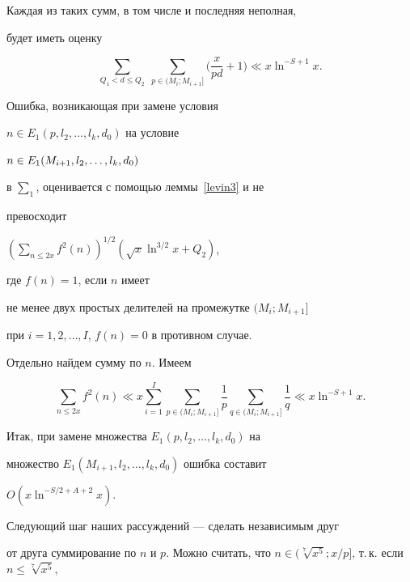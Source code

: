 Каждая из таких сумм, в том числе и последняя неполная,


будет иметь оценку


$$


\sum_{Q_1 < d \le Q_2}\; \sum_{p\in (M_{i};M_{i+1}]}


\bigg( \frac{x}{p d} + 1 \bigg)


\ll x \ln^{-S +1} x.


$$





Ошибка, возникающая при замене условия


$n\in E_1(p,l_2,\dotsc,l_k,d_0)$ на условие


$n\in E_1(M_{i+1},\linebreak l_2,\dotsc,l_k,d_0)$


в $\sum_1$, оценивается с помощью леммы~\ref{levin3} и не


превосходит


$(\sum_{n \le 2x} f^2(n) )^{1/2} (\sqrt x \ln^{3/2} x + Q_2 )$,


где $f(n)=1$, если $n$ имеет


не менее двух простых делителей на промежутке $(M_i; M_{i+1}]$


при $i=1,2, \dotsc, I$, $f(n)=0$ в противном случае.





Отдельно найдем сумму по $n$. Имеем


$$


\sum_{n \le 2x} f^2(n)


\ll x \sum_{i=1}^I \sum_{p\in (M_{i};M_{i+1}]} \frac1{p}


\sum_{q \in (M_i; M_{i+1}]} \frac1{q}


\ll x \ln^{-S+1} x.


$$


Итак, при замене множества $E_1(p, l_2, \dotsc, l_k, d_0)$ на


множество $E_1(M_{i+1},l_2, \dotsc, l_k, d_0)$ ошибка составит


$O(x \ln^{-S/2 + A + 2} x)$.





Следующий шаг наших рассуждений --- сделать независимым друг


от друга суммирование по $n$ и $p$. Можно считать, что $n \in


(\sqrt[7]{x^5}; x/p]$, т.\,к. если $n \le \sqrt[7]{x^5}$,



